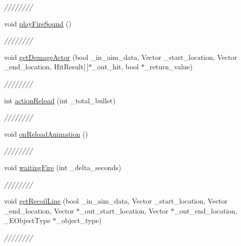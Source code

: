 \begin{DoxyCompactItemize}
\begin{DoxyCompactList}\small\item\em //////// \end{DoxyCompactList}\item 
void \hyperlink{class_weapons___actor_a5452db7714a6fd6fc8d4e60387ca1484}{play\+Fire\+Sound} ()
\begin{DoxyCompactList}\small\item\em //////// \end{DoxyCompactList}\item 
void \hyperlink{class_weapons___actor_a62f4a9add9f4521b19f82e38777fcc85}{get\+Demage\+Actor} (bool \+\_\+in\+\_\+aim\+\_\+data, Vector \+\_\+start\+\_\+location, Vector \+\_\+end\+\_\+location, Hit\+Result\mbox{[}$\,$\mbox{]}$\ast$\+\_\+out\+\_\+hit, bool $\ast$\+\_\+return\+\_\+value)
\begin{DoxyCompactList}\small\item\em //////// \end{DoxyCompactList}\item 
int \hyperlink{class_weapons___actor_ab1b1e922088fe0747842df3599dbb7b3}{action\+Reload} (int \+\_\+total\+\_\+bullet)
\begin{DoxyCompactList}\small\item\em //////// \end{DoxyCompactList}\item 
void \hyperlink{class_weapons___actor_a8b36c9a754942e42e22601add407e257}{on\+Reload\+Animation} ()
\begin{DoxyCompactList}\small\item\em //////// \end{DoxyCompactList}\item 
void \hyperlink{class_weapons___actor_aad412298d60d3ffd391c1e3b925eb206}{waiting\+Fire} (int \+\_\+delta\+\_\+seconds)
\begin{DoxyCompactList}\small\item\em //////// \end{DoxyCompactList}\item 
void \hyperlink{class_weapons___actor_a8e5bd4c8a55510f6b7db7674273128fa}{get\+Recoil\+Line} (bool \+\_\+in\+\_\+aim\+\_\+data, Vector \+\_\+start\+\_\+location, Vector \+\_\+end\+\_\+location, Vector $\ast$\+\_\+out\+\_\+start\+\_\+location, Vector $\ast$\+\_\+out\+\_\+end\+\_\+location, \+\_\+\+E\+Object\+Type $\ast$\+\_\+object\+\_\+type)
\begin{DoxyCompactList}\small\item\em //////// \end{DoxyCompactList}\item 

\end{DoxyCompactItemize}
